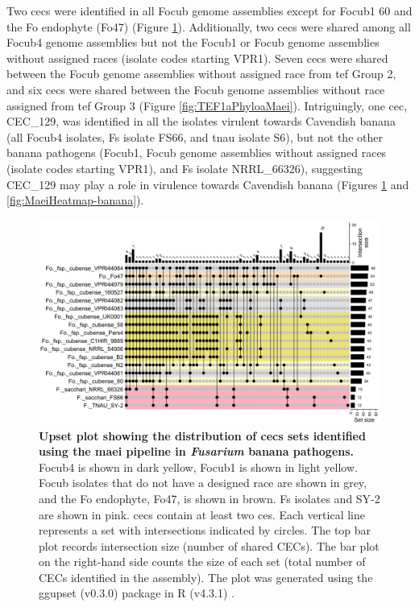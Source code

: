 Two \acp{cec} were identified in all \ac{Focub} genome assemblies except for  \ac{Focub1} 60 and the \ac{Fo} endophyte (Fo47) (Figure \ref{fig:UpSetCECofBanana}). Additionally, two \acp{cec} were shared among all \ac{Focub4} genome assemblies but not the \ac{Focub1} or \ac{Focub} genome assemblies without assigned races (isolate codes starting VPR1). Seven \acp{cec} were shared between the \ac{Focub} genome assemblies without assigned race from \ac{tef} Group 2, and six \acp{cec} were shared between the \ac{Focub} genome assemblies without race assigned from \ac{tef} Group 3 (Figure \ref{fig:TEF1aPhyloaMaei}). Intriguingly, one \ac{cec}, CEC\_129, was identified in all the isolates virulent towards Cavendish banana (all \ac{Focub4} isolates, \ac{Fs} isolate FS66, and \ac{tnau} isolate S6),  but not the other banana pathogens (\ac{Focub1}, \ac{Focub} genome assemblies without assigned races (isolate codes starting VPR1), and \ac{Fs} isolate NRRL\_66326), suggesting CEC\_129 may play a role in virulence towards Cavendish banana (Figures \ref{fig:UpSetCECofBanana} and \ref{fig:MaeiHeatmap-banana}). 

    
\begin{figure}
    \centering
    \includegraphics[width=\textwidth]{Figures/UpSetCECofBanana.png}
    \captionsetup{width=20cm}
    \caption[Upset plot of \ac{cec} distribution between \textit{Fusarium} banana pathogens.]{\textbf{Upset plot showing the distribution of \acp{cec} sets identified using the \ac{maei} pipeline in \textit{Fusarium} banana pathogens.}
    \ac{Focub4} is shown in dark yellow,  \ac{Focub1} is shown in light yellow. \ac{Focub} isolates that do not have a designed race are shown in grey, and the \ac{Fo} endophyte, Fo47, is shown in brown. \acl{Fs} isolates and SY-2 are shown in pink. \Acp{cec} contain at least two \aclp{ce}. Each vertical line represents a set with intersections indicated by circles. The top bar plot records intersection size (number of shared CECs). The bar plot on the right-hand side counts the size of each set (total number of CECs identified in the assembly). The plot was generated using the ggupset (v0.3.0) \parencite{ggupset} package in R (v4.3.1) \parencite{R}.}
    \label{fig:UpSetCECofBanana}
\end{figure}



